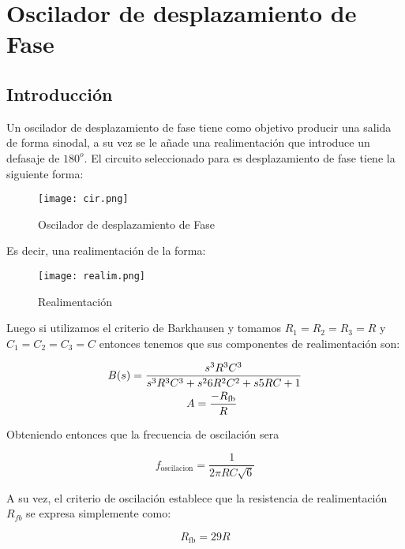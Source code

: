 \section{Oscilador de desplazamiento de Fase}

\subsection{Introducción}

Un oscilador de desplazamiento de fase tiene como objetivo producir una salida de forma sinodal, a su vez se le añade una realimentación que introduce un defasaje de $180^o$. El circuito seleccionado para es desplazamiento de fase tiene la siguiente forma:

\begin{figure}[H]
    \centering
    \texttt{[image: cir.png]}
    \caption{Oscilador de desplazamiento de Fase}
    \label{ej2cir}
\end{figure}

Es decir, una realimentación de la forma:

\begin{figure}[H]
    \centering
    \texttt{[image: realim.png]}
    \caption{Realimentación}
    \label{ej2realim}
\end{figure}

Luego si utilizamos el criterio de Barkhausen y tomamos $R_1 = R_2 = R_3 = R$ y $ C_1 = C_2 = C_3 = C$ entonces tenemos que sus componentes de realimentación son:

\begin{equation}
    \begin{split}
        & B(s) = \frac{s^3R^3C^3}{s^3R^3C^3+s^26R^2C^2+s5RC+1}\\
        & \hspace{2.5CM} A = \frac{-R_\mathrm{fb}}{R}
    \end{split}
\end{equation}

Obteniendo entonces que la frecuencia de oscilación sera

\begin{equation}
    f_\mathrm{oscilacion}=\frac{1}{2\pi RC\sqrt{6}}
\end{equation}

A su vez, el criterio de oscilación establece que la resistencia de realimentación $R_{fb}$ se expresa simplemente como:

\begin{equation}
    R_\mathrm{fb}=29 R
\end{equation}

